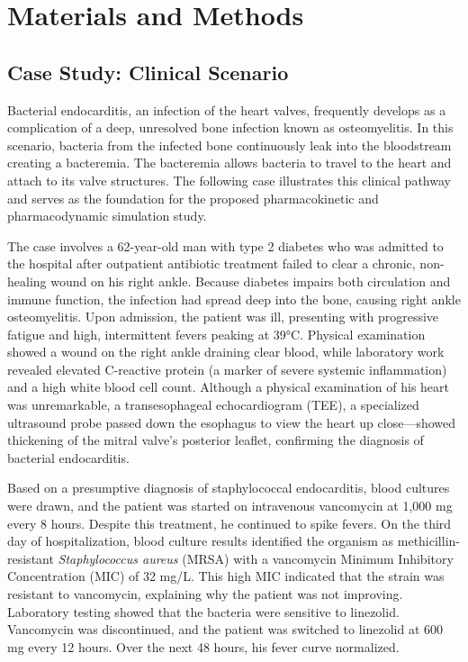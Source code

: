 \documentclass[journal]{IEEEtran}
\begin{document}
\section{Materials and Methods}

\subsection{Case Study: Clinical Scenario}
Bacterial endocarditis, an infection of the heart valves, frequently develops as a complication of a deep, unresolved bone infection known as osteomyelitis. In this scenario, bacteria from the infected bone continuously leak into the bloodstream creating a bacteremia. The bacteremia allows bacteria to travel to the heart and attach to its valve structures. The following case illustrates this clinical pathway and serves as the foundation for the proposed pharmacokinetic and pharmacodynamic simulation study.

The case involves a 62-year-old man with type 2 diabetes who was admitted to the hospital after outpatient antibiotic treatment failed to clear a chronic, non-healing wound on his right ankle. Because diabetes impairs both circulation and immune function, the infection had spread deep into the bone, causing right ankle osteomyelitis. Upon admission, the patient was ill, presenting with progressive fatigue and high, intermittent fevers peaking at 39°C. Physical examination showed a wound on the right ankle draining clear blood, while laboratory work revealed elevated C-reactive protein (a marker of severe systemic inflammation) and a high white blood cell count. Although a physical examination of his heart was unremarkable, a transesophageal echocardiogram (TEE), a specialized ultrasound probe passed down the esophagus to view the heart up close---showed thickening of the mitral valve's posterior leaflet, confirming the diagnosis of bacterial endocarditis.

Based on a presumptive diagnosis of staphylococcal endocarditis, blood cultures were drawn, and the patient was started on intravenous vancomycin at 1,000 mg every 8 hours. Despite this treatment, he continued to spike fevers. On the third day of hospitalization, blood culture results identified the organism as methicillin-resistant \textit{Staphylococcus aureus} (MRSA) with a vancomycin Minimum Inhibitory Concentration (MIC) of 32 mg/L. This high MIC indicated that the strain was resistant to vancomycin, explaining why the patient was not improving. Laboratory testing showed that the bacteria were sensitive to linezolid. Vancomycin was discontinued, and the patient was switched to linezolid at 600 mg every 12 hours. Over the next 48 hours, his fever curve normalized.
\end{document}
